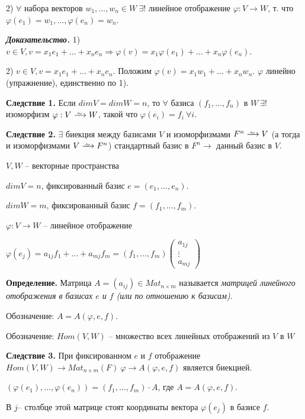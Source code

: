 2) $\forall$ набора векторов $w_1, \dots, w_n \in W \ \exists !$ линейное отображение $\varphi : V \rightarrow W$, т. что $\varphi(e_1) = w_1, \dots, \varphi(e_n) = w_n$.

\bigskip
\textbf{\textit{Доказательство.}} 1) $v \in V, v = x_1 e_1 + \dots + x_n e_n \Rightarrow \varphi(v) = x_1 \varphi (e_1) + \dots + x_n \varphi (e_n)$.

2) $v \in V, v = x_1 e_1 + \dots + x_n e_n$. Положим $\varphi (v) = x_1 w_1 + \dots + x_n w_n$. $\varphi$ линейно (упражнение), единственно по 1).

\bigskip
\textbf{Следствие 1.} Если $dimV = dimW = n$, то $\forall$ базиса $(f_1, \dots, f_n)$ в $W \ \exists !$ изоморфизм $\varphi : V \iso W$, такой что $\varphi (e_i) = f_i \ \forall i$.

\bigskip
\textbf{Следствие 2.} $\exists$ биекция между базисами $V$ и изоморфизмами $F^n \iso V$ (а тогда и изоморфизмами $V \iso F^n$) стандартный базис в $F^n \rightarrow$ данный базис в $V$.

\bigskip
$V, W$ -- векторные пространства

$dimV = n$, фиксированный базис $e = (e_1, \dots, e_n)$.

$dimW = m$, фиксированный базис $f = (f_1, \dots, f_m)$.

$\varphi : V \rightarrow W$ -- линейное отображение

$\varphi(e_j) = a_{1j} f_1 + \dots + a_{mj} f_m = (f_1, \dots, f_m) \begin{pmatrix} a_{1j} \\ \vdots \\ a_{mj} \end{pmatrix}$

\bigskip
\textbf{Определение.} Матрица $A = (a_{ij}) \in Mat_{n \times m}$ называется \textit{матрицей линейного отображения в базисах $e$ и $f$ (или по отношению к базисам)}.

Обозначение: $A = A (\varphi, e, f)$.

Обозначение: $Hom(V, W)$ -- множество всех линейных отображений из $V$ в $W$

\bigskip
\textbf{Следствие 3.} При фиксированном $e$ и $f$ отображение $Hom(V, W) \rightarrow Mat_{n \times m} (F) \ \varphi \rightarrow A(\varphi, e, f)$ является биекцией.

\bigskip
$(\varphi (e_1), \dots, \varphi(e_n)) = (f_1, \dots, f_m) \cdot A$, где $A = A(\varphi, e, f)$.

В $j$-- столбце этой матрице стоят координаты вектора $\varphi(e_j)$  в базисе $f$.

